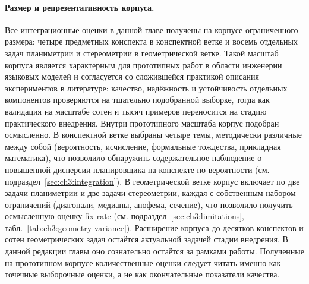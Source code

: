 \paragraph{Размер и репрезентативность корпуса.} Все интеграционные оценки в данной главе получены на корпусе ограниченного размера: четыре предметных конспекта в конспектной ветке и восемь отдельных задач планиметрии и стереометрии в геометрической ветке. Такой масштаб корпуса является характерным для прототипных работ в области инженерии языковых моделей и согласуется со сложившейся практикой описания экспериментов в литературе: качество, надёжность и устойчивость отдельных компонентов проверяются на тщательно подобранной выборке, тогда как валидация на масштабе сотен и тысяч примеров переносится на стадию практического внедрения. Внутри прототипного масштаба корпус подобран осмысленно. В конспектной ветке выбраны четыре темы, методически различные между собой (вероятность, исчисление, формальные тождества, прикладная математика), что позволило обнаружить содержательное наблюдение о повышенной дисперсии планировщика на конспекте по вероятности (см. подраздел~\ref{sec:ch3:integration}). В геометрической ветке корпус включает по две задачи планиметрии и две задачи стереометрии, каждая с собственным набором ограничений (диагонали, медианы, апофема, сечение), что позволило получить осмысленную оценку fix-rate (см. подраздел~\ref{sec:ch3:limitations}, табл.~\ref{tab:ch3:geometry-variance}). Расширение корпуса до десятков конспектов и сотен геометрических задач остаётся актуальной задачей стадии внедрения. В данной редакции главы оно сознательно остаётся за рамками работы. Полученные на прототипном корпусе количественные оценки следует читать именно как точечные выборочные оценки, а не как окончательные показатели качества.

